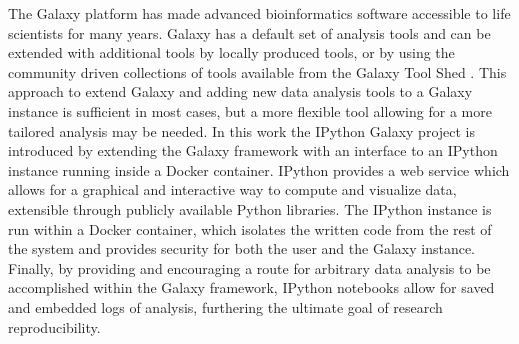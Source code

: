 \documentclass{bioinfo}
\begin{document}
The Galaxy platform \citep{Blank2010,Giardine2005,Goecks2010} has made advanced bioinformatics software accessible
to life scientists for many years. Galaxy has a default set of analysis tools and can be extended with additional
tools by locally produced tools, or by using the community driven collections of tools available from the Galaxy Tool Shed
\citep{Blankenber2014}. This approach to extend Galaxy and adding new data analysis tools to a Galaxy instance is sufficient
in most cases, but a more flexible tool allowing for a more tailored analysis may be needed.
In this work the IPython Galaxy project is introduced by extending the Galaxy framework with an interface to an
IPython \citep{Perez2007} instance running inside a Docker container.
IPython provides a web service which allows for a graphical and interactive way to compute and visualize data, 
extensible through publicly available Python libraries. The IPython instance is run within a Docker container, 
which isolates the written code from the rest of the system and provides security for both the user and the Galaxy instance. Finally, by providing and encouraging a route for arbitrary data analysis to be accomplished within the Galaxy framework, 
IPython notebooks allow for saved and embedded logs of analysis, furthering the ultimate goal of research reproducibility.
\end{document}
